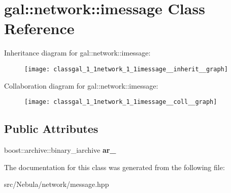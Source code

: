 \hypertarget{classgal_1_1network_1_1imessage}{\section{gal\-:\-:network\-:\-:imessage \-Class \-Reference}
\label{classgal_1_1network_1_1imessage}
}


\-Inheritance diagram for gal\-:\-:network\-:\-:imessage\-:
\nopagebreak
\begin{figure}[H]
\begin{center}
\leavevmode
\texttt{[image: classgal\_1\_1network\_1\_1imessage\_\_inherit\_\_graph]}
\end{center}
\end{figure}


\-Collaboration diagram for gal\-:\-:network\-:\-:imessage\-:
\nopagebreak
\begin{figure}[H]
\begin{center}
\leavevmode
\texttt{[image: classgal\_1\_1network\_1\_1imessage\_\_coll\_\_graph]}
\end{center}
\end{figure}
\subsection*{\-Public \-Attributes}
\begin{DoxyCompactItemize}
\item 
\hypertarget{classgal_1_1network_1_1imessage_a024ced0e503c39e7ff210c6eff53c2fd}{boost\-::archive\-::binary\-\_\-iarchive {\bfseries ar\-\_\-}}\label{classgal_1_1network_1_1imessage_a024ced0e503c39e7ff210c6eff53c2fd}

\end{DoxyCompactItemize}


\-The documentation for this class was generated from the following file\-:\begin{DoxyCompactItemize}
\item 
src/\-Nebula/network/message.\-hpp\end{DoxyCompactItemize}
